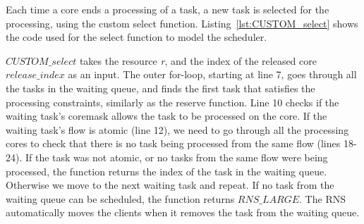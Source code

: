 Each time a core ends a processing of a task, a new task is selected for the processing, using the custom select function. Listing~\ref{lst:CUSTOM_select} shows the code used for the select function to model the scheduler.



$CUSTOM\_select$ takes the resource \emph{r}, and the index of the released core \emph{$release\_index$} as an input. The outer for-loop, starting at line 7, goes through all the tasks in the waiting queue, and finds the first task that satisfies the processing constraints, similarly as the reserve function. Line 10 checks if the waiting task's coremask allows the task to be processed on the core. If the waiting task's flow is atomic (line 12), we need to go through all the processing cores to check that there is no task being processed from the same flow (lines 18-24). If the task was not atomic, or no tasks from the same flow were being processed, the function returns the index of the task in the waiting queue. Otherwise we move to the next waiting task and repeat. If no task from the waiting queue can be scheduled, the function returns $RNS\_LARGE$. The RNS automatically moves the clients when it removes the task from the waiting queue.

